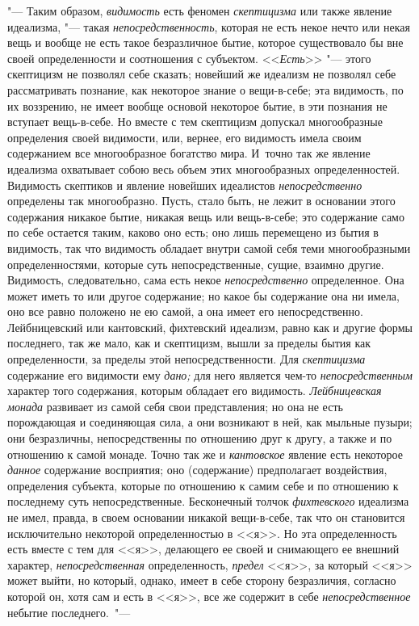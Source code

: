 "--- Таким образом, {\em видимость} есть феномен
{\em скептицизма} или также явление идеализма, "--- такая
{\em непосредственность}, которая не есть некое нечто
или некая вещь и вообще не есть такое безразличное бытие, которое
существовало бы вне своей определенности и соотношения с субъектом.
<<{\em Есть}>> "--- этого скептицизм не позволял себе
сказать; новейший же идеализм не позволял себе рассматривать познание, как
некоторое знание о вещи-в-себе; эта видимость, по их воззрению, не имеет
вообще основой некоторое бытие, в эти познания не вступает вещь-в-себе. Но
вместе с тем скептицизм допускал многообразные определения своей видимости,
или, вернее, его видимость имела своим содержанием все многообразное
богатство мира. И~точно так же явление идеализма охватывает собою весь
объем этих многообразных определенностей. Видимость скептиков и явление
новейших идеалистов {\em непосредственно} определены
так многообразно. Пусть, стало быть, не лежит в основании этого содержания
никакое бытие, никакая вещь или вещь-в-себе; это содержание само по себе
остается таким, каково оно есть; оно лишь перемещено из бытия в видимость,
так что видимость обладает внутри самой себя теми многообразными
определенностями, которые суть непосредственные, сущие, взаимно другие.
Видимость, следовательно, сама есть некое
{\em непосредственно} определенное. Она может иметь то
или другое содержание; но какое бы содержание она ни имела, оно все равно
положено не ею самой, а она имеет его непосредственно. Лейбницевский или
кантовский, фихтевский идеализм, равно как и другие формы последнего, так
же мало, как и скептицизм, вышли за пределы бытия как определенности, за
пределы этой непосредственности. Для {\em скептицизма}
содержание его видимости ему {\em дано;} для него
является чем-то {\em непосредственным} характер того
содержания, которым обладает его видимость.
{\em Лейбницевская монада} развивает из самой себя свои
представления; но она не есть порождающая и соединяющая сила, а они
возникают в ней, как мыльные пузыри; они безразличны, непосредственны по
отношению друг к другу, а также и по отношению к самой монаде. Точно так же
и {\em кантовское} явление есть некоторое
{\em данное} содержание восприятия; оно (содержание)
предполагает воздействия, определения субъекта, которые по отношению к
самим себе и по отношению к последнему суть непосредственные. Бесконечный
толчок
{\em фихтевского} идеализма не имел, правда, в своем
основании никакой вещи-в-себе, так что он становится исключительно
некоторой определенностью в <<я>>. Но эта определенность есть вместе с тем
для <<я>>, делающего ее своей и снимающего ее внешний характер,
{\em непосредственная} определенность,
{\em предел} <<я>>, за который <<я>> может выйти, но
который, однако, имеет в себе сторону безразличия, согласно которой он,
хотя сам и есть в <<я>>, все же содержит в себе
{\em непосредственное} небытие последнего.~"---

